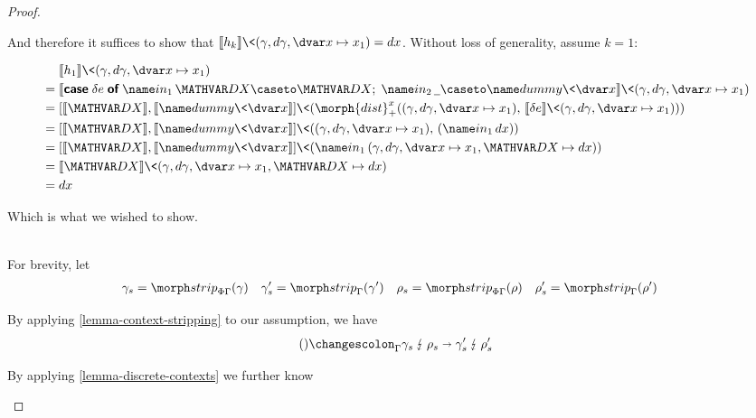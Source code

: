 \begin{proof}
\begin{description}[topsep=\baselineskip,itemsep=\baselineskip]
    \noindent
    And therefore it suffices to show that $\den{h_k} \<(\gamma, \dgamma, \dvar x \mapsto x_1) = dx$. Without loss of generality, assume $k = 1$:

    \begin{align*}
      &\phantom{{}={}}
      \den{h_1} \<(\gamma, \dgamma, \dvar x \mapsto x_1)
      \\
      &= \den{\emcase{\delta e}
      \inj 1 \mvar\dx \caseto \mvar\dx;\;
      \inj 2 \pwild \caseto \dummy\<\dvar x}
      \<(\gamma, \dgamma, \dvar x \mapsto x_1)
      \\
      &= \krof{\den{\mvar\dx}, \den{\dummy\<\dvar x}}
      \<(\morph{dist}^x_+
      ((\gamma, \dgamma, \dvar x \mapsto x_1),\,
      \den{\delta e}\<(\gamma, \dgamma, \dvar x \mapsto x_1)))
      \\
      &= \krof{\den{\mvar\dx}, \den{\dummy\<\dvar x}}
      \<((\gamma, \dgamma, \dvar x \mapsto x_1),\, (\inj 1 dx))
      \\
      &= \krof{\den{\mvar\dx}, \den{\dummy\<\dvar x}}
      \<(\inj 1 (\gamma, \dgamma, \dvar x \mapsto x_1, \mvar\dx \mapsto dx))
      \\
      &= \den{\mvar\dx}
      \<(\gamma, \dgamma, \dvar x \mapsto x_1, \mvar\dx \mapsto dx)
      \\
      &= dx
    \end{align*}

    Which is what we wished to show.

  \item[Case $\infer{
      \J e {\stripcx{\Gamma}} A
    }{
      \J{\ebox{e}}{\Gamma}{\iso A}
    }$,\, 
    $\phi \ebox e = \ebox{\etuple{\phi e, \delta e}}$,\, 
    $\delta \ebox e = \etuple{}$.
  ]~\\

    \noindent
    For brevity, let
    \begin{align*}
       \gamma_s &= \morphstrip_{\Phi\Gamma}(\gamma) &
       \gamma_s' &= \morphstrip_\Gamma(\gamma') &
       \rho_s &= \morphstrip_{\Phi\Gamma}(\rho) &
       \rho_s' &= \morphstrip_\Gamma(\rho')
    \end{align*}

    By applying \cref{lemma-context-stripping} to our assumption, we have
%
    \begin{equation}\label{equation-strip-valid}
    \weirdat{\Gamma}{()}{\gamma_s}{\rho_s}{\gamma_s'}{\rho_s'}
    \end{equation}

    \noindent
    By applying \cref{lemma-discrete-contexts} we further know


\end{description}
\end{proof}
